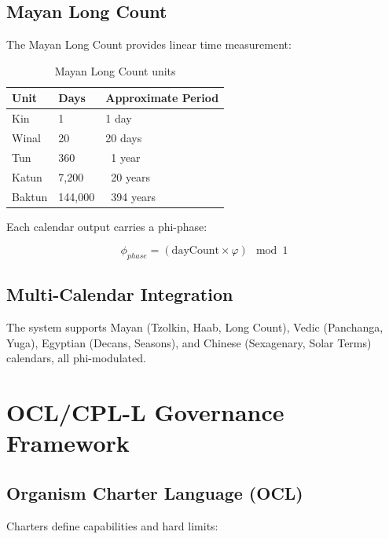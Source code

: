 \documentclass[11pt,a4paper]{article}
\begin{document}
\subsection{Mayan Long Count}

The Mayan Long Count provides linear time measurement:

\begin{table}[h]
\centering
\begin{tabular}{lll}
\toprule
Unit & Days & Approximate Period \\
\midrule
Kin & 1 & 1 day \\
Winal & 20 & 20 days \\
Tun & 360 & ~1 year \\
Katun & 7,200 & ~20 years \\
Baktun & 144,000 & ~394 years \\
\bottomrule
\end{tabular}
\caption{Mayan Long Count units}
\end{table}

Each calendar output carries a phi-phase:

\begin{equation}
\phi_{phase} = (\text{dayCount} \times \varphi) \mod 1
\end{equation}

\subsection{Multi-Calendar Integration}

The system supports Mayan (Tzolkin, Haab, Long Count), Vedic (Panchanga, Yuga), 
Egyptian (Decans, Seasons), and Chinese (Sexagenary, Solar Terms) calendars, 
all phi-modulated.


\section{OCL/CPL-L Governance Framework}

\subsection{Organism Charter Language (OCL)}

Charters define capabilities and hard limits:
\end{document}
